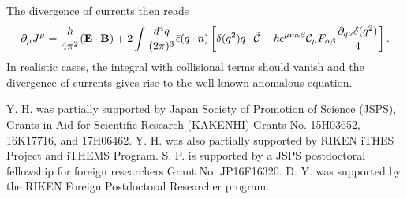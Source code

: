 \documentclass[aps,prd,showkeys,preprint,amsmath,amssymb,nofootinbib]{revtex4-1}
\begin{document}
The divergence of currents then reads
\begin{eqnarray}
\partial_{\mu}J^{\mu}=\frac{\hbar}{4\pi^2}({\bf E\cdot B})+2\int\frac{d^4q}{(2\pi)^3}\bar{\epsilon}(q\cdot n)\left[\delta(q^2)q\cdot\tilde{\mathcal{C}}+\hbar\epsilon^{\mu\nu\alpha\beta}\mathcal{C}_{\mu}F_{\alpha\beta}\frac{\partial_{q\nu}\delta(q^2)}{4}\right].
\end{eqnarray}
In realistic cases, the integral with collisional terms should vanish and the divergence of currents gives rise to the well-known anomalous equation.   


\acknowledgments
Y. H. was partially supported by Japan Society of Promotion of Science (JSPS), Grants-in-Aid for Scientific Research
(KAKENHI) Grants No. 15H03652, 16K17716, and 17H06462.  Y. H. was also partially supported by RIKEN iTHES Project and iTHEMS Program.
S. P. is supported by a JSPS postdoctoral fellowship for foreign researchers Grant No. JP16F16320. D. Y. was supported by the RIKEN Foreign Postdoctoral Researcher program.

%
%
%

\end{document}
